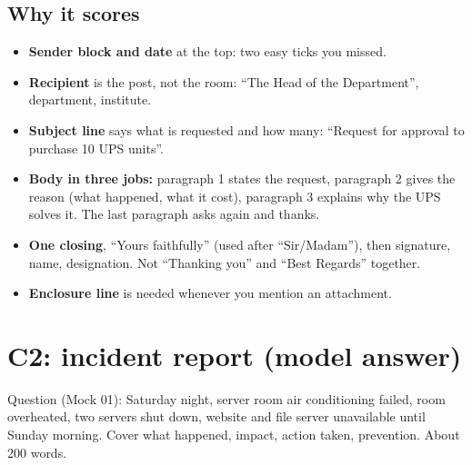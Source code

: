 \documentclass[11pt,a4paper]{article}
\begin{document}
\subsection{Why it scores}
\begin{itemize}
\item \textbf{Sender block and date} at the top: two easy ticks you missed.
\item \textbf{Recipient} is the post, not the room: ``The Head of the Department'', department, institute.
\item \textbf{Subject line} says what is requested and how many: ``Request for approval to purchase 10 UPS units''.
\item \textbf{Body in three jobs:} paragraph 1 states the request, paragraph 2 gives the reason (what happened, what it cost), paragraph 3 explains why the UPS solves it. The last paragraph asks again and thanks.
\item \textbf{One closing}, ``Yours faithfully'' (used after ``Sir/Madam''), then signature, name, designation. Not ``Thanking you'' and ``Best Regards'' together.
\item \textbf{Enclosure line} is needed whenever you mention an attachment.
\end{itemize}

\section{C2: incident report (model answer)}
Question (Mock 01): Saturday night, server room air conditioning failed, room overheated, two servers shut down, website and file server unavailable until Sunday morning. Cover what happened, impact, action taken, prevention. About 200 words.
\end{document}
